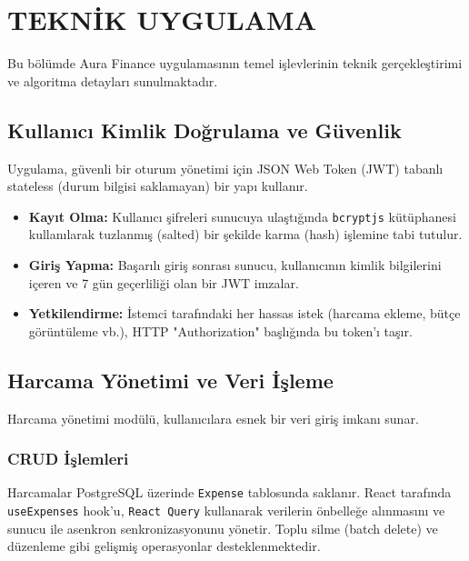 \chapter{TEKNİK UYGULAMA}\label{ch:teknik_uygulama}
\vspace*{-1cm}

Bu bölümde Aura Finance uygulamasının temel işlevlerinin teknik gerçekleştirimi ve algoritma detayları sunulmaktadır.

\section{Kullanıcı Kimlik Doğrulama ve Güvenlik}

Uygulama, güvenli bir oturum yönetimi için JSON Web Token (JWT) tabanlı stateless (durum bilgisi saklamayan) bir yapı kullanır.
\begin{itemize}
    \item \textbf{Kayıt Olma:} Kullanıcı şifreleri sunucuya ulaştığında \texttt{bcryptjs} kütüphanesi kullanılarak tuzlanmış (salted) bir şekilde karma (hash) işlemine tabi tutulur.
    \item \textbf{Giriş Yapma:} Başarılı giriş sonrası sunucu, kullanıcının kimlik bilgilerini içeren ve 7 gün geçerliliği olan bir JWT imzalar.
    \item \textbf{Yetkilendirme:} İstemci tarafındaki her hassas istek (harcama ekleme, bütçe görüntüleme vb.), HTTP "Authorization" başlığında bu token'ı taşır.
\end{itemize}

\section{Harcama Yönetimi ve Veri İşleme}

Harcama yönetimi modülü, kullanıcılara esnek bir veri giriş imkanı sunar.

\subsection{CRUD İşlemleri}
Harcamalar PostgreSQL üzerinde \texttt{Expense} tablosunda saklanır. React tarafında \texttt{useExpenses} hook'u, \texttt{React Query} kullanarak verilerin önbelleğe alınmasını ve sunucu ile asenkron senkronizasyonunu yönetir. Toplu silme (batch delete) ve düzenleme gibi gelişmiş operasyonlar desteklenmektedir.

